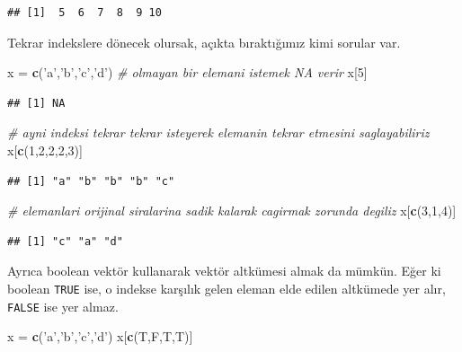 \documentclass[]{book}
\newenvironment{Shaded}{\begin{snugshade}}{\end{snugshade}}
\newcommand{\CommentTok}[1]{\textcolor[rgb]{0.56,0.35,0.01}{\textit{#1}}}
\newcommand{\DecValTok}[1]{\textcolor[rgb]{0.00,0.00,0.81}{#1}}
\newcommand{\KeywordTok}[1]{\textcolor[rgb]{0.13,0.29,0.53}{\textbf{#1}}}
\newcommand{\NormalTok}[1]{#1}
\newcommand{\StringTok}[1]{\textcolor[rgb]{0.31,0.60,0.02}{#1}}
\begin{document}
\begin{verbatim}
## [1]  5  6  7  8  9 10
\end{verbatim}

Tekrar indekslere dönecek olursak, açıkta bıraktığımız kimi sorular var.

\begin{Shaded}
\begin{Highlighting}[]
\NormalTok{x =}\StringTok{ }\KeywordTok{c}\NormalTok{(}\StringTok{'a'}\NormalTok{,}\StringTok{'b'}\NormalTok{,}\StringTok{'c'}\NormalTok{,}\StringTok{'d'}\NormalTok{)}
\CommentTok{# olmayan bir elemani istemek NA verir}
\NormalTok{x[}\DecValTok{5}\NormalTok{]}
\end{Highlighting}
\end{Shaded}

\begin{verbatim}
## [1] NA
\end{verbatim}

\begin{Shaded}
\begin{Highlighting}[]
\CommentTok{# ayni indeksi tekrar tekrar isteyerek elemanin tekrar etmesini saglayabiliriz}
\NormalTok{x[}\KeywordTok{c}\NormalTok{(}\DecValTok{1}\NormalTok{,}\DecValTok{2}\NormalTok{,}\DecValTok{2}\NormalTok{,}\DecValTok{2}\NormalTok{,}\DecValTok{3}\NormalTok{)]}
\end{Highlighting}
\end{Shaded}

\begin{verbatim}
## [1] "a" "b" "b" "b" "c"
\end{verbatim}

\begin{Shaded}
\begin{Highlighting}[]
\CommentTok{# elemanlari orijinal siralarina sadik kalarak cagirmak zorunda degiliz}
\NormalTok{x[}\KeywordTok{c}\NormalTok{(}\DecValTok{3}\NormalTok{,}\DecValTok{1}\NormalTok{,}\DecValTok{4}\NormalTok{)]}
\end{Highlighting}
\end{Shaded}

\begin{verbatim}
## [1] "c" "a" "d"
\end{verbatim}

Ayrıca boolean vektör kullanarak vektör altkümesi almak da mümkün. Eğer
ki boolean \texttt{TRUE} ise, o indekse karşılık gelen eleman elde
edilen altkümede yer alır, \texttt{FALSE} ise yer almaz.

\begin{Shaded}
\begin{Highlighting}[]
\NormalTok{x =}\StringTok{ }\KeywordTok{c}\NormalTok{(}\StringTok{'a'}\NormalTok{,}\StringTok{'b'}\NormalTok{,}\StringTok{'c'}\NormalTok{,}\StringTok{'d'}\NormalTok{)}
\NormalTok{x[}\KeywordTok{c}\NormalTok{(T,F,T,T)]}
\end{Highlighting}
\end{Shaded}
\end{document}
